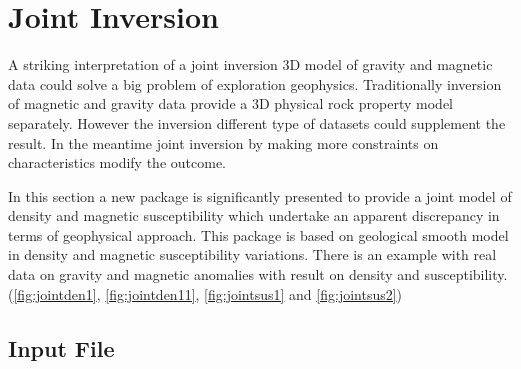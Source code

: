\chapter{Joint Inversion}\label{Chp:cook:joint inversion}

A striking interpretation of a joint inversion 3D model of gravity and magnetic data could solve a big problem of exploration geophysics. Traditionally inversion of magnetic and gravity data provide a 3D physical rock property model separately. However the inversion different type of datasets could supplement the result. In the meantime joint inversion by making more constraints on characteristics modify the outcome.

In this section a new package is significantly presented to provide a joint model of density and magnetic susceptibility which undertake an apparent discrepancy in terms of geophysical approach. This package is based on geological smooth model in density and magnetic susceptibility variations. There is an example with real data on gravity and magnetic anomalies with result on density and susceptibility.(\ref{fig:jointden1}, \ref{fig:jointden11}, \ref{fig:jointsus1} and \ref{fig:jointsus2})


% 
% 
% 
% 


\section{Input File} 

